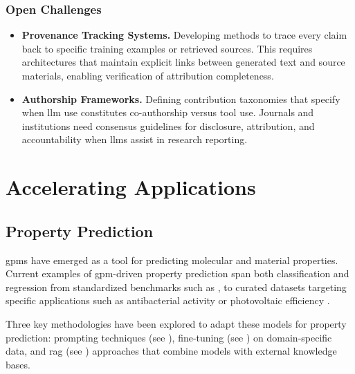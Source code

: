 \subsubsection{Open Challenges}
\begin{itemize}
    \item \textbf{Provenance Tracking Systems.} Developing methods to trace every claim back to specific training examples or retrieved sources. This requires architectures that maintain explicit links between generated text and source materials, enabling verification of attribution completeness.
    
    \item \textbf{Authorship Frameworks.} Defining contribution taxonomies that specify when \gls{llm} use constitutes co-authorship versus tool use. Journals and institutions need consensus guidelines for disclosure, attribution, and accountability when \glspl{llm} assist in research reporting.
\end{itemize}


\section{Accelerating Applications}
\subsection{Property Prediction} \label{sec:prediction}

\glspl{gpm} have emerged as a tool for predicting molecular and material properties. 
Current examples of \gls{gpm}-driven property prediction span both classification and regression from standardized benchmarks such as  \autocite{wu2018moleculenet}, to curated datasets targeting specific applications such as antibacterial activity \autocite{chithrananda2020chemberta} or photovoltaic efficiency \autocite{aneesh2025semantic}.

Three key methodologies have been explored to adapt these models for property prediction: prompting techniques (see ), fine-tuning (see ) on domain-specific data, and \gls{rag} (see ) approaches that combine models with external knowledge bases. 

